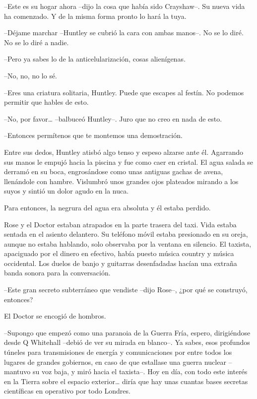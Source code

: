 {--Este es su hogar ahora --dijo la cosa que había sido Crayshaw--. Su
nueva vida ha comenzado. Y de la misma forma pronto lo hará la tuya.}

{--Déjame marchar --Huntley se cubrió la cara con ambas manos--. No se
lo diré. No se lo diré a nadie.}

{--Pero ya sabes lo de la anticelularización, cosas alienígenas.}

{--No, no, no lo sé.}

{--Eres una criatura solitaria, Huntley. Puede que escapes al festín. No
podemos permitir que hables de esto.}

{--No, por favor\ldots{} --balbuceó Huntley--. Juro que no creo en nada
de esto.}

{--Entonces permítenos que te montemos una demostración.}

{Entre sus dedos, Huntley atisbó algo tenso y espeso alzarse ante él.
 Agarrando sus manos le empujó hacia la piscina y fue como caer en
 cristal. El agua salada se derramó en su boca, engrosándose como unas
 antiguas gachas de avena, llenándole con hambre. Vislumbró unos grandes
ojos plateados mirando a los suyos y sintió un dolor agudo en la nuca.}

{Para entonces, la negrura del agua era absoluta y él estaba perdido.}

\mbox{}

{Rose y el Doctor estaban atrapados en la parte trasera del taxi. Vida
 estaba sentada en el asiento delantero. Su teléfono móvil estaba
 presionado en su oreja, aunque no estaba hablando, solo observaba por la
 ventana en silencio. El taxista, apaciguado por el dinero en efectivo,
 había puesto música country y música occidental. Los duelos de banjo y
 guitarras desenfadadas hacían una extraña banda sonora para la
conversación.}

{--Este gran secreto subterráneo que vendiste --dijo Rose--, ¿por qué se
construyó, entonces?}

{El Doctor se encogió de hombros.}

{--Supongo que empezó como una paranoia de la Guerra Fría, espero,
 dirigiéndose desde Q Whitehall --debió de ver su mirada en blanco--. Ya
 sabes, esos profundos túneles para transmisiones de energía y
 comunicaciones por entre todos los lugares de grandes gobiernos, en caso
 de que estallase una guerra nuclear --mantuvo su voz baja, y miró hacia
 el taxista--. Hoy en día, con todo este interés en la Tierra sobre el
 espacio exterior\ldots{} diría que hay unas cuantas bases secretas
científicas en operativo por todo Londres.}


